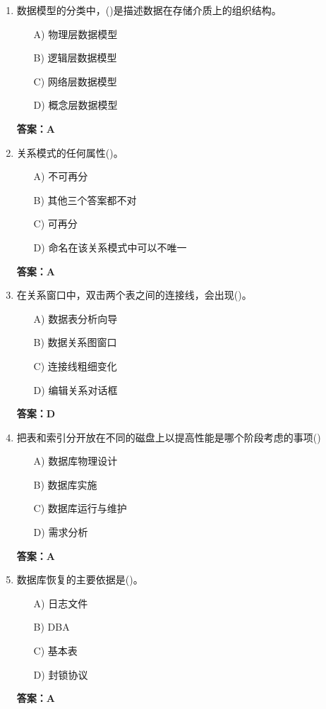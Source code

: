 \documentclass[a4paper,12pt]{article}
\begin{document}
\begin{enumerate}[label=\arabic*.]
\item 数据模型的分类中，()是描述数据在存储介质上的组织结构。
\begin{itemize}
    \item[A)] 物理层数据模型
    \item[B)] 逻辑层数据模型
    \item[C)] 网络层数据模型
    \item[D)] 概念层数据模型
\end{itemize}
\textbf{答案：A}

\item 关系模式的任何属性()。
\begin{itemize}
    \item[A)] 不可再分
    \item[B)] 其他三个答案都不对
    \item[C)] 可再分
    \item[D)] 命名在该关系模式中可以不唯一
\end{itemize}
\textbf{答案：A}

\item 在关系窗口中，双击两个表之间的连接线，会出现()。
\begin{itemize}
    \item[A)] 数据表分析向导
    \item[B)] 数据关系图窗口
    \item[C)] 连接线粗细变化
    \item[D)] 编辑关系对话框
\end{itemize}
\textbf{答案：D}

\item 把表和索引分开放在不同的磁盘上以提高性能是哪个阶段考虑的事项()
\begin{itemize}
    \item[A)] 数据库物理设计
    \item[B)] 数据库实施
    \item[C)] 数据库运行与维护
    \item[D)] 需求分析
\end{itemize}
\textbf{答案：A}

\item 数据库恢复的主要依据是()。
\begin{itemize}
    \item[A)] 日志文件
    \item[B)] DBA
    \item[C)] 基本表
    \item[D)] 封锁协议
\end{itemize}
\textbf{答案：A}


\end{enumerate}
\end{document}
